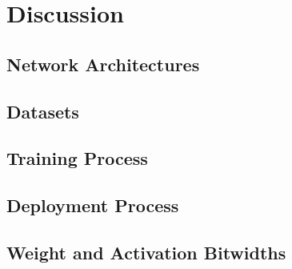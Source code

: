 \chapter{Discussion} %

\label{Chapter7} %



\section{Network Architectures}


\section{Datasets}


\section{Training Process}

\section{Deployment Process}


\section{Weight and Activation Bitwidths}
